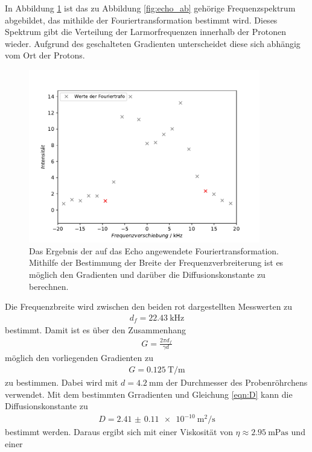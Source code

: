 In Abbildung \ref{fig:ft} ist das zu Abbildung \ref{fig:echo_ab} gehörige Frequenzspektrum abgebildet, das mithilde der 
Fouriertransformation bestimmt wird. Dieses Spektrum gibt die Verteilung der Larmorfrequenzen innerhalb der Protonen wieder.
Aufgrund des geschalteten Gradienten unterscheidet diese sich abhängig vom Ort der Protons.
\begin{figure}[H]
  \centering
  \includegraphics[width=0.9\textwidth]{../Auswertung/echo_ft.pdf}
  \caption{Das Ergebnis der auf das Echo angewendete Fouriertransformation. Mithilfe der Bestimmung der Breite der Frequenzverbreiterung
  ist es möglich den Gradienten und darüber die Diffusionskonstante zu berechnen.}
  \label{fig:ft}
\end{figure} \noindent
Die Frequenzbreite wird zwischen den beiden rot dargestellten Messwerten zu
\begin{align}
  d_f = \SI{22.43}{\kilo\hertz}
\end{align}
bestimmt.
Damit ist es über den Zusammenhang
\begin{align}
  G = \frac{2\pi d_f}{\gamma d}
\end{align}
möglich den vorliegenden Gradienten zu
\begin{align}
  G = \SI{0.125}{\tesla\per\meter}
\end{align}
zu bestimmen. Dabei wird mit $d = \SI{4.2}{\milli\meter}$ der Durchmesser des Probenröhrchens verwendet.
Mit dem bestimmten Grradienten und Gleichung \ref{eqn:D} kann die Diffusionskonstante zu 
\begin{align}
  D = \SI{2.41(011)e-10}{\square\meter\per\second}
\end{align}
bestimmt werden.
Daraus ergibt sich mit einer Viskosität von $\eta \approx \SI{2.95}{\milli\pascal\second}$ \cite{viso} und einer 
